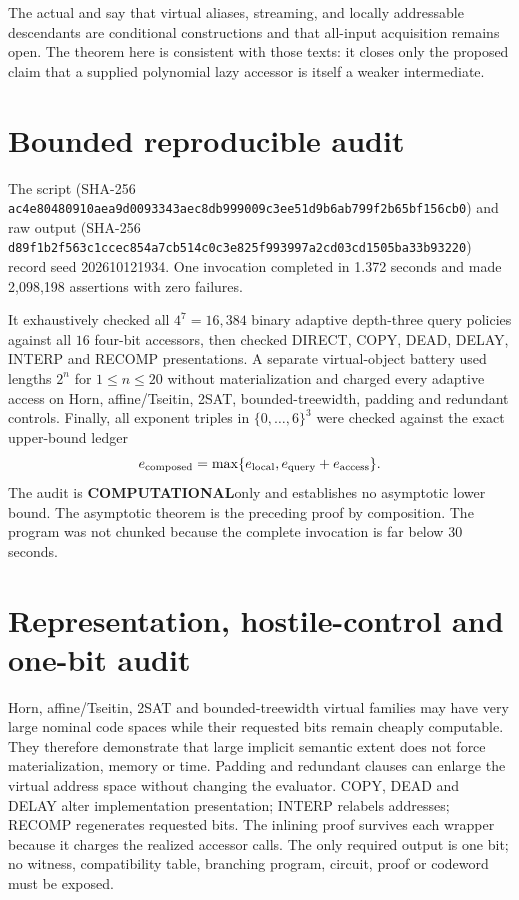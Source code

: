 \documentclass[11pt]{article}
\newcommand{\COMP}{\textbf{COMPUTATIONAL}}
\begin{document}
The actual  and  say that virtual aliases,
streaming, and locally addressable descendants are conditional constructions
and that all-input acquisition remains open.  The theorem here is consistent
with those texts: it closes only the proposed claim that a supplied
polynomial lazy accessor is itself a weaker intermediate.

\section{Bounded reproducible audit}
The script
(SHA-256 \texttt{ac4e80480910aea9d0093343aec8db999009c3ee51d9b6ab799f2b65bf156cb0})
and raw output
(SHA-256 \texttt{d89f1b2f563c1ccec854a7cb514c0c3e825f993997a2cd03cd1505ba33b93220})
record seed 202610121934.  One invocation completed in 1.372 seconds and made
2,098,198 assertions with zero failures.

It exhaustively checked all $4^7=16{,}384$ binary adaptive depth-three query
policies against all $16$ four-bit accessors, then checked DIRECT, COPY, DEAD,
DELAY, INTERP and RECOMP presentations.  A separate virtual-object battery
used lengths $2^n$ for $1\le n\le20$ without materialization and charged every
adaptive access on Horn, affine/Tseitin, 2SAT, bounded-treewidth, padding and
redundant controls.  Finally, all exponent triples in $\{0,\ldots,6\}^3$ were
checked against the exact upper-bound ledger
\[
 e_{\rm composed}=\max\{e_{\rm local},e_{\rm query}+e_{\rm access}\}.
\]
The audit is \COMP only and establishes no asymptotic lower bound.  The
asymptotic theorem is the preceding proof by composition.  The program was
not chunked because the complete invocation is far below 30 seconds.

\section{Representation, hostile-control and one-bit audit}
Horn, affine/Tseitin, 2SAT and bounded-treewidth virtual families may have
very large nominal code spaces while their requested bits remain cheaply
computable.  They therefore demonstrate that large implicit semantic extent
does not force materialization, memory or time.  Padding and redundant clauses
can enlarge the virtual address space without changing the evaluator.  COPY,
DEAD and DELAY alter implementation presentation; INTERP relabels addresses;
RECOMP regenerates requested bits.  The inlining proof survives each wrapper
because it charges the realized accessor calls.  The only required output is
one bit; no witness, compatibility table, branching program, circuit, proof
or codeword must be exposed.
\end{document}
